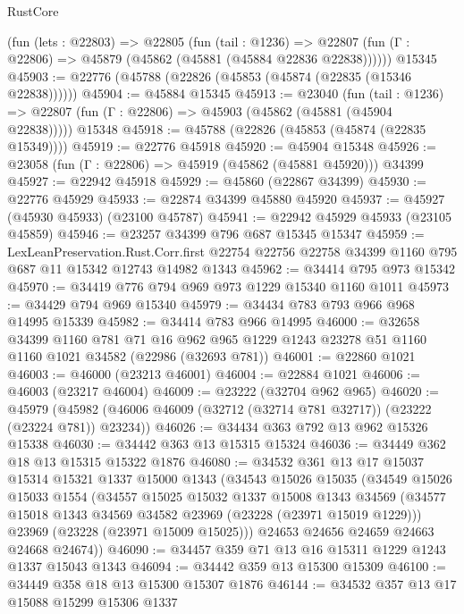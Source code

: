 \begin{lexlean}{RustCore}
\begin{coremodule}
    (fun (lets : @22803) =>
    @22805
      (fun (tail : @1236) =>
      @22807 (fun (Γ : @22806) => @45879 (@45862 (@45881 (@45884 @22836 @22838))))))
    @15345
@45903 := @22776 (@45788 (@22826 (@45853 (@45874 (@22835 (@15346 @22838))))))
@45904 := @45884 @15345
@45913 := @23040
    (fun (tail : @1236) => @22807 (fun (Γ : @22806) => @45903 (@45862 (@45881 (@45904 @22838)))))
    @15348
@45918 := @45788 (@22826 (@45853 (@45874 (@22835 @15349))))
@45919 := @22776 @45918
@45920 := @45904 @15348
@45926 := @23058 (fun (Γ : @22806) => @45919 (@45862 (@45881 @45920))) @34399
@45927 := @22942 @45918
@45929 := @45860 (@22867 @34399)
@45930 := @22776 @45929
@45933 := @22874 @34399 @45880 @45920
@45937 := @45927 (@45930 @45933) (@23100 @45787)
@45941 := @22942 @45929 @45933 (@23105 @45859)
@45946 := @23257 @34399 @796 @687 @15345 @15347
@45959 := LexLeanPreservation.Rust.Corr.first
    @22754
    @22756
    @22758
    @34399
    @1160
    @795
    @687
    @11
    @15342
    @12743
    @14982
    @1343
@45962 := @34414 @795 @973 @15342
@45970 := @34419 @776 @794 @969 @973 @1229 @15340 @1160 @1011
@45973 := @34429 @794 @969 @15340
@45979 := @34434 @783 @793 @966 @968 @14995 @15339
@45982 := @34414 @783 @966 @14995
@46000 := @32658
    @34399
    @1160
    @781
    @71
    @16
    @962
    @965
    @1229
    @1243
    @23278
    @51
    @1160
    @1160
    @1021
    @34582
    (@22986 (@32693 @781))
@46001 := @22860 @1021
@46003 := @46000 (@23213 @46001)
@46004 := @22884 @1021
@46006 := @46003 (@23217 @46004)
@46009 := @23222 (@32704 @962 @965)
@46020 := @45979
    (@45982 (@46006 @46009 (@32712 (@32714 @781 @32717)) (@23222 (@23224 @781)) @23234))
@46026 := @34434 @363 @792 @13 @962 @15326 @15338
@46030 := @34442 @363 @13 @15315 @15324
@46036 := @34449 @362 @18 @13 @15315 @15322 @1876
@46080 := @34532
    @361
    @13
    @17
    @15037
    @15314
    @15321
    @1337
    @15000
    @1343
    (@34543
      @15026
      @15035
      (@34549
        @15026
        @15033
        @1554
        (@34557
          @15025
          @15032
          @1337
          @15008
          @1343
          @34569
          (@34577 @15018 @1343 @34569 @34582 @23969 (@23228 (@23971 @15019 @1229)))
          @23969
          (@23228 (@23971 @15009 @15025)))
        @24653
        @24656
        @24659
        @24663
        @24668
        @24674))
@46090 := @34457 @359 @71 @13 @16 @15311 @1229 @1243 @1337 @15043 @1343
@46094 := @34442 @359 @13 @15300 @15309
@46100 := @34449 @358 @18 @13 @15300 @15307 @1876
@46144 := @34532
    @357
    @13
    @17
    @15088
    @15299
    @15306
    @1337

\end{coremodule}
\end{lexlean}
